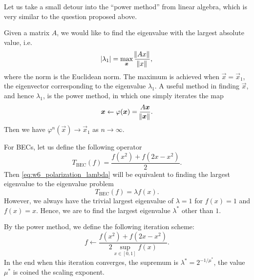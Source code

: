\begin{remark}
    Let us take a small detour into the ``power method'' from linear algebra, which is very similar to the question proposed above.

    Given a matrix $A$, we would like to find the eigenvalue with the largest absolute value, i.e.
    \begin{equation*}
        \abs{\lambda_1} = \max_{\boldsymbol{x}} \frac{\norm{Ax}}{\norm{x}},
    \end{equation*}
    where the norm is the Euclidean norm. The maximum is achieved when $\vec{x}=\vec{x}_1$, the eigenvector corresponding to the eigenvalue $\lambda_1$. A useful method in finding $\vec{x}$, and hence $\lambda_1$, is the power method, in which one simply iterates the map
    \begin{equation*}
        \boldsymbol{x} \leftarrow \varphi(\boldsymbol{x}) = \frac{A\boldsymbol{x}}{\norm{\boldsymbol{x}}}.
    \end{equation*}
    Then we have $\varphi^n(\vec{x})\rightarrow\vec{x}_1$ as $n\rightarrow\infty$.
\end{remark}

For BECs, let us define the following operator
\begin{equation}
    T_{\mathrm{BEC}}(f) = \frac{f(x^2)+f(2x-x^2)}{2}.
\end{equation}
Then \autoref{eq:w6_polarization_lambda} will be equivalent to finding the largest eigenvalue to the eigenvalue problem
\begin{equation}
    T_{\mathrm{BEC}}(f) = \lambda f(x).
\end{equation}
However, we always have the trivial largest eigenvalue of $\lambda=1$ for $f(x)=1$ and $f(x)=x$. Hence, we are to find the largest eigenvalue $\lambda^*$ other than $1$.


By the power method, we define the following iteration scheme:
\begin{equation}
    f \leftarrow \frac{f(x^2) + f(2x-x^2)}{2\sup_{x\in[0,1]}f(x)}. \label{eq:w6_polar_speed_fxn}
\end{equation}
In the end when this iteration converges, the supremum is $\lambda^*=2^{-1/\mu^*}$, the value $\mu^*$ is coined the scaling exponent.

